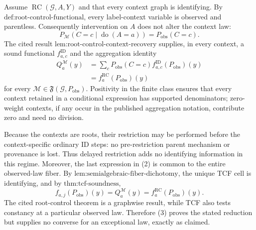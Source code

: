 Assume \(\operatorname{RC}(\mathcal G,A,Y)\) and that every context graph is identifying.  By \(\text{def:root-control-functional}\), every label-context variable is observed and parentless.  Consequently intervention on \(A\) does not alter the context law:
\[
P_{\mathcal M}(C=c\mid\operatorname{do}(A=a))=P_{\mathrm{obs}}(C=c).
\tag{1}
\]
The cited result \(\text{lem:root-control-context-recovery}\) supplies, in every context, a sound functional \(f^{\mathrm{ID}}_{a,c}\) and the aggregation identity
\[
\begin{aligned}
Q_a^{\mathcal M}(y)
&=\sum_cP_{\mathrm{obs}}(C=c)
f^{\mathrm{ID}}_{a,c}(P_{\mathrm{obs}})(y)\\
&=f_a^{\mathrm{RC}}(P_{\mathrm{obs}})(y)
\end{aligned}
\tag{2}
\]
for every \(\mathcal M\in\mathfrak F(\mathcal G,P_{\mathrm{obs}})\).  Positivity in the finite class ensures that every context retained in a conditional expression has supported denominators; zero-weight contexts, if any occur in the published aggregation notation, contribute zero and need no division.

Because the contexts are roots, their restriction may be performed before the context-specific ordinary ID steps: no pre-restriction parent mechanism or provenance is lost.  Thus delayed restriction adds no identifying information in this regime.  Moreover, the last expression in (2) is common to the entire observed-law fiber.  By \(\text{lem:semialgebraic-fiber-dichotomy}\), the unique TCF cell is identifying, and by \(\text{thm:tcf-soundness}\),
\[
f_{a,j}(P_{\mathrm{obs}})(y)
=Q_a^{\mathcal M}(y)
=f_a^{\mathrm{RC}}(P_{\mathrm{obs}})(y).
\tag{3}
\]
The cited root-control theorem is a graphwise result, while TCF also tests constancy at a particular observed law.  Therefore (3) proves the stated reduction but supplies no converse for an exceptional law, exactly as claimed.